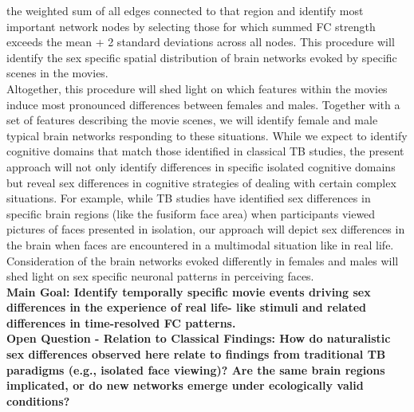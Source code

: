 \documentclass[11pt,a4paper]{article}
\begin{document}
the weighted sum of all edges connected to that region and identify most important network nodes by
selecting those for which summed FC strength exceeds the mean + 2 standard deviations across all nodes.
This procedure will identify the sex specific spatial distribution of brain networks evoked by specific scenes
in the movies.\\
Altogether, this procedure will shed light on which features within the movies induce most pronounced
differences between females and males. Together with a set of features describing the movie scenes, we
will identify female and male typical brain networks responding to these situations. While we expect to
identify cognitive domains that match those identified in classical TB studies, the present approach will not
only identify differences in specific isolated cognitive domains but reveal sex differences in cognitive
strategies of dealing with certain complex situations. For example, while TB studies have identified sex
differences in specific brain regions (like the fusiform face area) when participants viewed pictures of faces
presented in isolation, our approach will depict sex differences in the brain when faces are encountered in
a multimodal situation like in real life. Consideration of the brain networks evoked differently in females
and males will shed light on sex specific neuronal patterns in perceiving faces.\\
\textbf{Main Goal: Identify temporally specific movie events driving sex differences in the experience of real life-
like stimuli and related differences in time-resolved FC patterns.}\\
\textbf{Open Question - Relation to Classical Findings: How do naturalistic sex differences observed here relate
to findings from traditional TB paradigms (e.g., isolated face viewing)? Are the same brain regions
implicated, or do new networks emerge under ecologically valid conditions?}



\printbibliography
\end{document}
